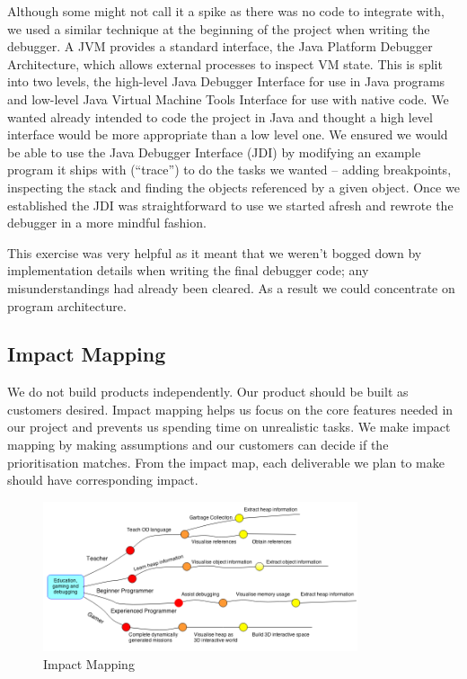 \documentclass[10pt, a4paper]{article}
\begin{document}
Although some might not call it a spike as there was no code to integrate with, we used a similar technique at the beginning of the project when writing the debugger. A JVM provides a standard interface, the Java Platform Debugger Architecture, which allows external processes to inspect VM state. This is split into two levels, the high-level Java Debugger Interface for use in Java programs and low-level Java Virtual Machine Tools Interface for use with native code. We wanted already intended to code the project in Java and thought a high level interface would be more appropriate than a low level one. We ensured we would be able to use the Java Debugger Interface (JDI) by modifying an example program it ships with (“trace”) to do the tasks we wanted -- adding breakpoints, inspecting the stack and finding the objects referenced by a given object. Once we established the JDI was straightforward to use we started afresh and rewrote the debugger in a more mindful fashion.

This exercise was very helpful as it meant that we weren’t bogged down by implementation details when writing the final debugger code; any misunderstandings had already been cleared. As a result we could concentrate on program architecture.

\subsection{Impact Mapping}

We do not build products independently. Our product should be built as customers desired.  Impact mapping helps us focus on the core features needed in our project and prevents us spending time on unrealistic tasks. We make impact mapping by making assumptions and our customers can decide if the prioritisation matches. From the impact map, each deliverable we plan to make should have corresponding impact.  

\begin{figure}[h]
        \centering
        \includegraphics[width=350px]{images/Impact_mapping.png}
        \caption{Impact Mapping}
\end{figure}
\end{document}
